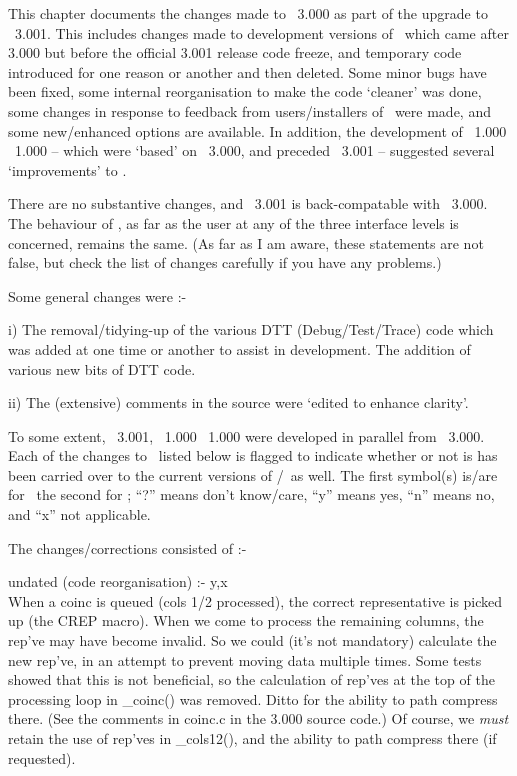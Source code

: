 
%

This chapter documents the changes made to \ace\ 3.000 as part of the
  upgrade to \ace\ 3.001.
This includes changes made to development versions of \ace\ which came
  after 3.000 but before the official 3.001 release \amp code freeze, and
  temporary code introduced for one reason or another and then deleted.
Some minor bugs have been fixed, some internal reorganisation to make the
  code `cleaner' was done, some changes in response to feedback from
  users/installers of \ace\ were made, and some new/enhanced options are
  available.
In addition, the development of \pace\ 1.000 \amp \peace\ 1.000 -- which
  were `based' on \ace\ 3.000, and preceded \ace\ 3.001 -- suggested
  several `improvements' to \ace.

There are no substantive changes, and \ace\ 3.001 is back-compatable with 
  \ace\ 3.000.
The behaviour of \ace, as far as the user at any of the three interface
  levels is concerned, remains the same.
(As far as I am aware, these statements are not false, but check the list
  of changes carefully if you have any problems.)

Some general changes were :-

i)  The removal/tidying-up of the various DTT (Debug/Test/Trace) code which
    was added at one time or another to assist in development.
The addition of various new bits of DTT code.

ii) The (extensive) comments in the source were `edited to enhance
    clarity'.

To some extent, \ace\ 3.001, \pace\ 1.000 \amp \peace\ 1.000 were developed
  in parallel from \ace\ 3.000.
Each of the changes to \ace\ listed below is flagged to indicate whether or
  not is has been carried over to the current versions of \pace/\peace\ as
  well.
The first symbol(s) is/are for \pace\ \amp the second for \peace; 
  ``?'' means don't know/care,
  ``y'' means yes,
  ``n'' means no, and
  ``x'' not applicable.

The changes/corrections consisted of :- 

undated (code reorganisation) :- y,x \\
When a coinc is queued (\amp cols 1/2 processed), the correct
  representative is picked up (the CREP macro).
When we come to process the remaining columns, the rep've may have become
  invalid.
So we could (it's not mandatory) calculate the new rep've, in an attempt
  to prevent moving data multiple times.
Some tests showed that this is not beneficial, so the calculation of
  rep'ves at the top of the processing loop in \_coinc() was removed.
Ditto for the ability to path compress there.
(See the comments in coinc.c in the 3.000  source code.)
Of course, we \emph{must} retain the use of rep'ves in \_cols12(), and the 
  ability to path compress there (if requested).

